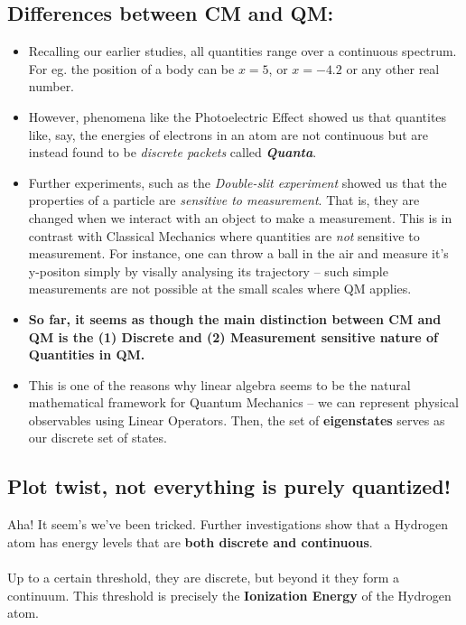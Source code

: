 \documentclass[twoside]{article}
\begin{document}
\subsection*{Differences between CM and QM:}
\begin{itemize}
   \item Recalling our earlier studies, all quantities range over a continuous spectrum. For eg. the position of a body can be $x = 5$, or $x = -4.2$ or any other real number. 
   
   \item However, phenomena like the Photoelectric Effect showed us that quantites like, say, the energies of electrons in an atom are not continuous but are instead found to be \emph{discrete packets} called \textbf{\emph{Quanta}}. 
   
   \item Further experiments, such as the \emph{Double-slit experiment} showed us that the properties of a particle are \emph{sensitive to measurement}. That is, they are changed when we interact with an object to make a measurement. This is in contrast with Classical Mechanics where quantities are \emph{not} sensitive to measurement. For instance, one can throw a ball in the air and measure it's y-positon simply by visally analysing its trajectory -- such simple measurements are not possible at the small scales where QM applies.
   
   \item \textbf{So far, it seems as though the main distinction between CM and QM is the (1) Discrete and (2) Measurement sensitive nature of Quantities in QM.}
   
   \item This is one of the reasons why linear algebra seems to be the natural mathematical framework for Quantum Mechanics -- we can represent physical observables using Linear Operators. Then, the set of \textbf{eigenstates} serves as our discrete set of states.
\end{itemize}

\subsection*{Plot twist, not everything is purely quantized!}
Aha! It seem's we've been tricked. Further investigations show that a Hydrogen atom has energy levels that are \textbf{both discrete and continuous}. 
\\
\\
Up to a certain threshold, they are discrete, but beyond it they form a continuum. This threshold is precisely the \textbf{Ionization Energy} of the Hydrogen atom.
\end{document}
